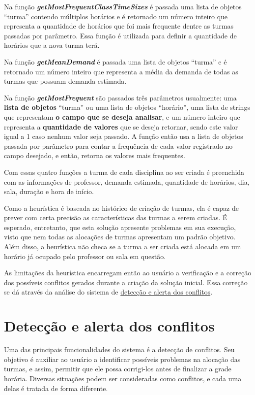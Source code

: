 Na função \textbf{\textit{getMostFrequentClassTimeSizes}} é passada uma lista de objetos ``turma'' contendo múltiplos horários e é retornado um número inteiro que representa a quantidade de horários que foi mais frequente dentre as turmas passadas por parâmetro. Essa função é utilizada para definir a quantidade de horários que a nova turma terá.

Na função \textbf{\textit{getMeanDemand}} é passada uma lista de objetos ``turma'' e é retornado um número inteiro que representa a média da demanda de todas as turmas que possuam demanda estimada.

Na função \textbf{\textit{getMostFrequent}} são passados três parâmetros usualmente: uma \textbf{lista de objetos} ``turma'' ou uma lista de objetos ``horário'', uma lista de strings que representam \textbf{o campo que se deseja analisar}, e um número inteiro que representa a \textbf{quantidade de valores} que se deseja retornar, sendo este valor igual a 1 caso nenhum valor seja passado. A função então usa a lista de objetos passada por parâmetro para contar a frequência de cada valor registrado no campo desejado, e então, retorna os valores mais frequentes.

Com essas quatro funções a turma de cada disciplina ao ser criada é preenchida com as informações de professor, demanda estimada, quantidade de horários, dia, sala, duração e hora de início.

Como a heurística é baseada no histórico de criação de turmas, ela é capaz de prever com certa precisão as características das turmas a serem criadas. É esperado, entretanto, que esta solução apresente problemas em sua execução, visto que nem todas as alocações de turmas apresentam um padrão objetivo. Além disso, a heurística não checa se a turma a ser criada está alocada em um horário já ocupado pelo professor ou sala em questão.

As limitações da heurística encarregam então ao usuário a verificação e a correção dos possíveis conflitos gerados durante a criação da solução inicial. Essa correção se dá através da análise do sistema de \hyperref[sec:conflitos]{detecção e alerta dos conflitos}.

\section{Detecção e alerta dos conflitos} \label{sec:conflitos} %

Uma das principais funcionalidades do sistema é a detecção de conflitos. Seu objetivo é auxiliar ao usuário a identificar possíveis problemas na alocação das turmas, e assim, permitir que ele possa corrigi-los antes de finalizar a grade horária. Diversas situações podem ser consideradas como conflitos, e cada uma delas é tratada de forma diferente.

